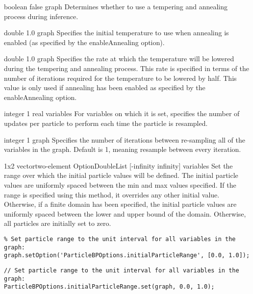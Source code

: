 
{boolean}
{false}
{graph}
{Determines whether to use a tempering and annealing process during inference.}


{double}
{1.0}
{graph}
{Specifies the initial temperature to use when annealing is enabled (as specified by the enableAnnealing option).}


{double}
{1.0}
{graph}
{Specifies the rate at which the temperature will be lowered during the tempering and annealing process. This rate is specified in terms of the number of iterations required for the temperature to be lowered by half. This value is only used if annealing has been enabled as specified by the enableAnnealing option.}


{integer}
{1}
{real variables}
{For variables on which it is set, specifies the number of updates per particle to perform each time the particle is resampled.}


{integer}
{1}
{graph}
{Specifies the number of iterations between re-sampling all of the variables in the graph. Default is 1, meaning resample between every iteration.}


{\ifmatlab 1x2 vector\fi \ifjava two-element OptionDoubleList\fi}
{[-infinity infinity]}
{variables}
{Set the range over which the initial particle values will be defined. The initial particle values are uniformly spaced between the min and max values specified. If the range is specified using this method, it overrides any other initial value. Otherwise, if a finite domain has been specified, the initial particle values are uniformly spaced between the lower and upper bound of the domain. Otherwise, all particles are initially set to zero.}

\ifmatlab
\begin{lstlisting}
% Set particle range to the unit interval for all variables in the graph:
graph.setOption('ParticleBPOptions.initialParticleRange', [0.0, 1.0]);
\end{lstlisting}
\fi
\ifjava
\begin{lstlisting}
// Set particle range to the unit interval for all variables in the graph:
ParticleBPOptions.initialParticleRange.set(graph, 0.0, 1.0);
\end{lstlisting}
\fi


